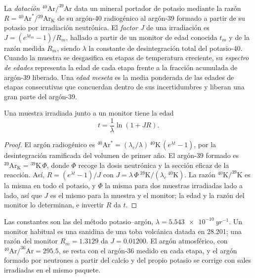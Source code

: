 \begin{definition}
\label{def:b3:advanced-geochronology:arar}
La \emph{datación $^{40}\mathrm{Ar}/^{39}\mathrm{Ar}$}
data un mineral portador de potasio mediante la razón $R =
{}^{40}\mathrm{Ar}^*/{}^{39}\mathrm{Ar}_{\mathrm K}$ de su argón-40 radiogénico
al argón-39 formado a partir de su potasio por irradiación neutrónica. El
\emph{factor J} de una irradiación es $J = (e^{\lambda
t_m} - 1)/R_m$, hallado a partir de un monitor de edad conocida $t_m$ y de la razón medida
$R_m$, siendo $\lambda$ la constante de desintegración total del potasio-40. Cuando la muestra
se desgasifica en etapas de temperatura creciente, su \emph{espectro
de edades} representa la edad de cada etapa frente a la
fracción acumulada de argón-39 liberado. Una \emph{edad
meseta} es la media ponderada de las edades de etapas consecutivas que
concuerdan dentro de sus incertidumbres y liberan una gran parte del argón-39.
\end{definition}

\begin{theorem}\label{thm:b3:advanced-geochronology:arar}
Una muestra irradiada junto a un monitor tiene la edad
\[
t = \frac1\lambda\ln(1 + JR).
\]
\end{theorem}

\begin{proof}
El argón radiogénico es $^{40}\mathrm{Ar}^* = (\lambda_e/\lambda)\,
{}^{40}\mathrm{K}\,(e^{\lambda t} - 1)$, por la desintegración ramificada del
volumen de primer año. El argón-39 formado es $^{39}\mathrm{Ar}_{\mathrm K} =
{}^{39}\mathrm{K}\,\Phi$, donde $\Phi$ recoge la dosis neutrónica y la
sección eficaz de la reacción. Así, $R = (e^{\lambda t} - 1)/J$ con $J =
\lambda\,\Phi\,{}^{39}\mathrm{K}/(\lambda_e\,{}^{40}\mathrm{K})$. La razón
$^{40}\mathrm{K}/^{39}\mathrm{K}$ es la misma en todo el potasio, y $\Phi$ la
misma para dos muestras irradiadas lado a lado, así que $J$ es el mismo para la muestra
y el monitor; la edad y la razón del monitor lo determinan, e invertir $R$ da
$t$.
\end{proof}

Las constantes son las del método potasio--argón, $\lambda =
\qty{5.543e-10}{yr^{-1}}$. Un monitor habitual es una sanidina de una toba volcánica
datada en \qty{28.201}{\Ma}; una razón del monitor $R_m = 1.3129$ da $J =
0.01200$. El argón atmosférico, con $^{40}\mathrm{Ar}/^{36}\mathrm{Ar} = 295.5$,
se resta con el argón-36 medido en cada etapa, y el argón formado por
neutrones a partir del calcio y del propio potasio se corrige con sales
irradiadas en el mismo paquete.

